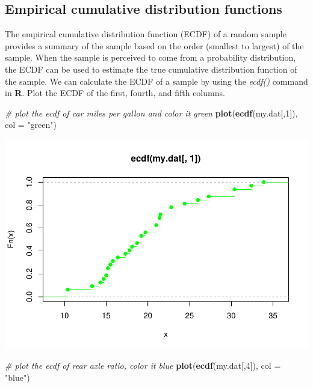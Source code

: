 \documentclass[
]{article}
\newenvironment{Shaded}{\begin{snugshade}}{\end{snugshade}}
\newcommand{\CommentTok}[1]{\textcolor[rgb]{0.56,0.35,0.01}{\textit{#1}}}
\newcommand{\DataTypeTok}[1]{\textcolor[rgb]{0.13,0.29,0.53}{#1}}
\newcommand{\DecValTok}[1]{\textcolor[rgb]{0.00,0.00,0.81}{#1}}
\newcommand{\KeywordTok}[1]{\textcolor[rgb]{0.13,0.29,0.53}{\textbf{#1}}}
\newcommand{\NormalTok}[1]{#1}
\newcommand{\StringTok}[1]{\textcolor[rgb]{0.31,0.60,0.02}{#1}}
\begin{document}
\hypertarget{empirical-cumulative-distribution-functions}{%
\subsection{Empirical cumulative distribution
functions}\label{empirical-cumulative-distribution-functions}}

The empirical cumulative distribution function (ECDF) of a random sample
provides a summary of the sample based on the order (smallest to
largest) of the sample. When the sample is perceived to come from a
probability distribution, the ECDF can be used to estimate the true
cumulative distribution function of the sample. We can calculate the
ECDF of a sample by using the \emph{ecdf()} command in \textbf{R}. Plot
the ECDF of the first, fourth, and fifth columns.

\begin{Shaded}
\begin{Highlighting}[]
\CommentTok{# plot the ecdf of car miles per gallon and color it green}
\KeywordTok{plot}\NormalTok{(}\KeywordTok{ecdf}\NormalTok{(my.dat[,}\DecValTok{1}\NormalTok{]), }\DataTypeTok{col =} \StringTok{"green"}\NormalTok{)}
\end{Highlighting}
\end{Shaded}

\includegraphics{CA2_DataAnalysis_files/figure-latex/unnamed-chunk-14-1.pdf}

\begin{Shaded}
\begin{Highlighting}[]
\CommentTok{# plot the ecdf of rear axle ratio, color it blue}
\KeywordTok{plot}\NormalTok{(}\KeywordTok{ecdf}\NormalTok{(my.dat[,}\DecValTok{4}\NormalTok{]), }\DataTypeTok{col =} \StringTok{"blue"}\NormalTok{)}
\end{Highlighting}
\end{Shaded}
\end{document}
